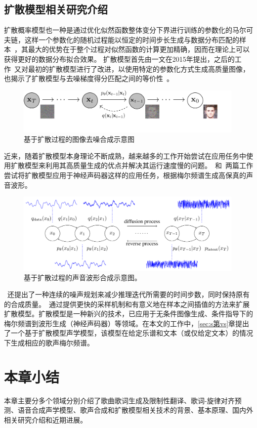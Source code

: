 \subsection{扩散模型相关研究介绍}
扩散概率模型也一种是通过优化似然函数整体变分下界进行训练的参数化的马尔可夫链，这样一个参数化的随机过程能以恒定的时间步长生成与数据分布匹配的样本~\citep{Ho2020ddpm}，其最大的优势在于整个过程对似然函数的计算更加精确，因而在理论上可以获得更好的数据分布拟合效果。
扩散模型首先由\citet{sohl2015deep}一文在2015年提出，之后的工作\citet{Ho2020ddpm}~又对最初的扩散模型进行了改进，以使用特定的参数化方式生成高质量图像，也揭示了扩散模型与去噪梯度得分匹配之间的等价性~\citep{song2019generative,song2021scorebased}。
\begin{figure}[!h]
  \includegraphics[width=0.99\textwidth]{figure/related/ddpm.pdf}
  \caption{基于扩散过程的图像去噪合成示意图}
\end{figure}
近来，随着扩散模型本身理论不断成熟，越来越多的工作开始尝试在应用任务中使用扩散模型来利用其高质量生成的优点并解决其运行速度慢的问题。\citet{kong2021diffwave}~和\citet{chen2021wavegrad}~两篇工作尝试将扩散模型应用于神经声码器这样的应用任务，根据梅尔频谱生成高保真的声音波形。
\begin{figure}[!h]
  \includegraphics[width=0.99\textwidth]{figure/related/diffwave.png}
  \caption{基于扩散过程的声音波形合成示意图\citep{kong2021diffwave}。}
\end{figure}
\citet{chen2021wavegrad}~还提出了一种连续的噪声规划来减少推理迭代所需要的时间步数，同时保持原有的合成质量。\citet{song2021denoising}~通过提供更快的采样机制和有意义地在样本之间插值的方法来扩展扩散模型。扩散模型是一种新兴的技术，已应用于无条件图像生成、条件指导下的梅尔频谱到波形生成（神经声码器）等领域。在本文的工作中，\ref{sec:s第vs}章提出了一个基于扩散模型声学模型，该模型在给定乐谱和文本（或仅给定文本）的情况下生成相应的歌声梅尔频谱。
\section{本章小结}
本章主要分多个领域分别介绍了歌曲歌词生成及限制性翻译、歌词-旋律对齐预测、语音合成声学模型、歌声合成和扩散模型相关技术的背景、基本原理、国内外相关研究介绍和近期进展。
